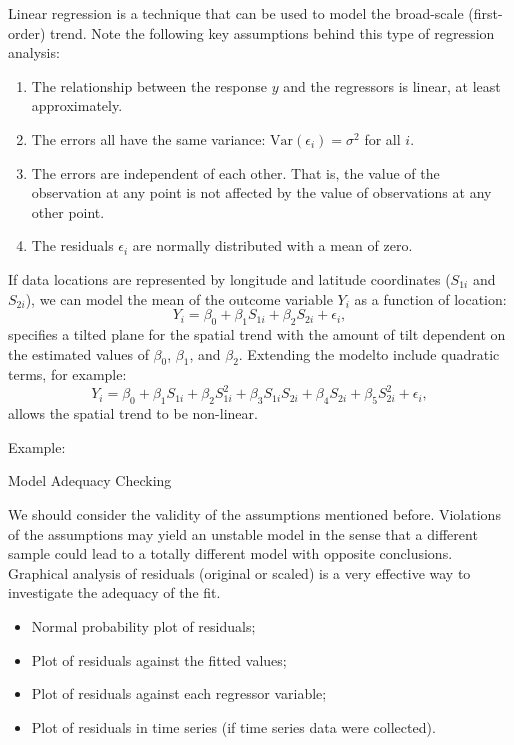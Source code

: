 \documentclass[]{book}
\providecommand{\tightlist}{%
  \setlength{\itemsep}{0pt}\setlength{\parskip}{0pt}}
\begin{document}
Linear regression is a technique that can be used to model the
broad-scale (first-order) trend. Note the following key assumptions
behind this type of regression analysis:

\begin{enumerate}
\def\labelenumi{(\roman{enumi})}
\tightlist
\item
  The relationship between the response \(y\) and the regressors is
  linear, at least approximately.
\item
  The errors all have the same variance:
  \(\mathrm{Var}(\epsilon_i) = \sigma^2\) for all \(i\).
\item
  The errors are independent of each other. That is, the value of the
  observation at any point is not affected by the value of observations
  at any other point.
\item
  The residuals \(\epsilon_i\) are normally distributed with a mean of
  zero.
\end{enumerate}

If data locations are represented by longitude and latitude coordinates
(\(S_{1i}\) and \(S_{2i}\)), we can model the mean of the outcome
variable \(Y_i\) as a function of location: \[
Y_i=\beta_0+\beta_1S_{1i}+\beta_2S_{2i}+\epsilon_i,
\] specifies a tilted plane for the spatial trend with the amount of
tilt dependent on the estimated values of \(\beta_0\), \(\beta_1\), and
\(\beta_2\). Extending the modelto include quadratic terms, for example:
\[
Y_i=\beta_0+\beta_1S_{1i}+\beta_2S_{1i}^2+\beta_3S_{1i}S_{2i}
+\beta_4S_{2i}+\beta_5S_{2i}^2+\epsilon_i,
\] allows the spatial trend to be non-linear.

Example:

Model Adequacy Checking

We should consider the validity of the assumptions mentioned before.
Violations of the assumptions may yield an unstable model in the sense
that a different sample could lead to a totally different model with
opposite conclusions. Graphical analysis of residuals (original or
scaled) is a very effective way to investigate the adequacy of the fit.

\begin{itemize}
\tightlist
\item
  Normal probability plot of residuals;
\item
  Plot of residuals against the fitted values;
\item
  Plot of residuals against each regressor variable;
\item
  Plot of residuals in time series (if time series data were collected).
\end{itemize}
\end{document}
